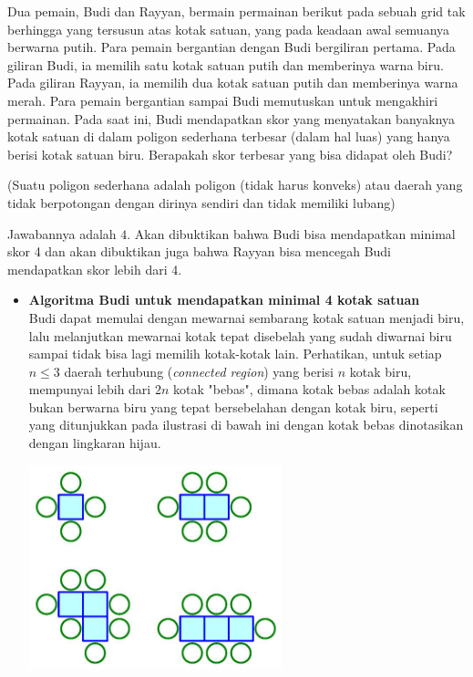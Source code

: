 \documentclass[11pt]{scrartcl}
\begin{document}
\begin{soaljawab}
Dua pemain, Budi dan Rayyan, bermain permainan berikut pada sebuah grid tak berhingga yang tersusun atas kotak satuan, yang pada keadaan awal semuanya berwarna putih. Para pemain bergantian dengan Budi bergiliran pertama. Pada giliran Budi, ia memilih satu kotak satuan putih dan memberinya warna biru. Pada giliran Rayyan, ia memilih dua kotak satuan putih dan memberinya warna merah. Para pemain bergantian sampai Budi memutuskan untuk mengakhiri permainan. Pada saat ini, Budi mendapatkan skor yang menyatakan banyaknya kotak satuan di dalam poligon sederhana terbesar (dalam hal luas) yang hanya berisi kotak satuan biru. Berapakah skor terbesar yang bisa didapat oleh Budi?

(Suatu poligon sederhana adalah poligon (tidak harus konveks) atau daerah yang tidak berpotongan dengan dirinya sendiri dan tidak memiliki lubang)
    \begin{solusi}
        Jawabannya adalah $4$. Akan dibuktikan bahwa Budi bisa mendapatkan minimal skor 4 dan akan dibuktikan juga bahwa Rayyan bisa mencegah Budi mendapatkan skor lebih dari 4.

        \begin{itemize}
            \item \textbf{Algoritma Budi untuk mendapatkan minimal 4 kotak satuan}\\
            Budi dapat memulai dengan mewarnai sembarang kotak satuan menjadi biru, lalu melanjutkan mewarnai kotak tepat disebelah yang sudah diwarnai biru sampai tidak bisa lagi memilih kotak-kotak lain. Perhatikan, untuk setiap $n \le 3$ daerah terhubung (\textit{connected region}) yang berisi $n$ kotak biru, mempunyai lebih dari $2n$ kotak "bebas", dimana kotak bebas adalah kotak bukan berwarna biru yang tepat bersebelahan dengan kotak biru, seperti yang ditunjukkan pada ilustrasi di bawah ini dengan kotak bebas dinotasikan dengan lingkaran hijau.

            \begin{center}
                \includegraphics[scale=1]{gametheory10}
            \end{center}
            

\end{itemize}
\end{solusi}
\end{soaljawab}
\end{document}
